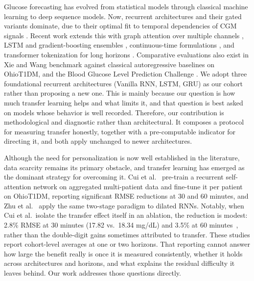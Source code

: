 \documentclass[conference]{IEEEtran}
\begin{document}
Glucose forecasting has evolved from statistical models \cite{Bremer1999} through
classical machine learning to deep sequence models. Now, recurrent architectures and
their gated variants dominate, due to their optimal fit to temporal dependencies of CGM signals \cite{Mazgouti2025}. Recent work extends this with graph attention over multiple channels \cite{Piao2025}, LSTM and gradient-boosting ensembles \cite{Mazgouti2025}, continuous-time formulations \cite{Fitzgerald2023}, and transformer tokenization for long horizons \cite{Karagoz2025}. Comparative
evaluations also exist in Xie and Wang \cite{XieWang2020} benchmark against classical
autoregressive baselines on OhioT1DM, and the Blood Glucose Level Prediction Challenge \cite{MarlingBunescu2020}. We adopt three
foundational recurrent architectures (Vanilla RNN, LSTM, GRU) as our cohort
rather than proposing a new one. This is mainly because our question is how much transfer learning
helps and what limits it, and that question is best asked on models whose behavior
is well recorded. Therefore, our contribution is methodological and diagnostic
rather than architectural. It composes a protocol for measuring transfer honestly,
together with a pre-computable indicator for directing it, and both apply unchanged
to newer architectures.

Although the need for personalization is now well established in the literature, data scarcity remains its primary obstacle, and transfer learning has emerged as the dominant strategy for overcoming it. Cui et al.~\cite{CUI9474665} pre-train a recurrent self-attention network on aggregated multi-patient data and fine-tune it per patient on OhioT1DM, reporting significant RMSE reductions at 30 and 60 minutes, and Zhu et al.~\cite{Zhu2020Dilated} apply the same two-stage paradigm to dilated
RNNs. Notably, when Cui et al.\ isolate the transfer effect itself in an ablation, the reduction is modest: 2.8\% RMSE at 30 minutes (17.82 vs.\ 18.34 mg/dL) and 3.5\% at 60 minutes~\cite{CUI9474665}, rather than the double-digit gains sometimes attributed to transfer. These studies report cohort-level averages at one or two horizons. That reporting cannot answer how large the benefit really is once it is
measured consistently, whether it holds across architectures and horizons, and
what explains the residual difficulty it leaves behind. Our work addresses those
questions directly.
\end{document}

